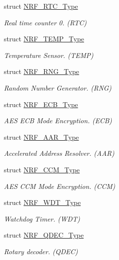 \begin{DoxyCompactItemize}
struct \hyperlink{struct_n_r_f___r_t_c___type}{N\+R\+F\+\_\+\+R\+T\+C\+\_\+\+Type}
\begin{DoxyCompactList}\small\item\em Real time counter 0. (R\+T\+C) \end{DoxyCompactList}\item 
struct \hyperlink{struct_n_r_f___t_e_m_p___type}{N\+R\+F\+\_\+\+T\+E\+M\+P\+\_\+\+Type}
\begin{DoxyCompactList}\small\item\em Temperature Sensor. (T\+E\+M\+P) \end{DoxyCompactList}\item 
struct \hyperlink{struct_n_r_f___r_n_g___type}{N\+R\+F\+\_\+\+R\+N\+G\+\_\+\+Type}
\begin{DoxyCompactList}\small\item\em Random Number Generator. (R\+N\+G) \end{DoxyCompactList}\item 
struct \hyperlink{struct_n_r_f___e_c_b___type}{N\+R\+F\+\_\+\+E\+C\+B\+\_\+\+Type}
\begin{DoxyCompactList}\small\item\em A\+E\+S E\+C\+B Mode Encryption. (E\+C\+B) \end{DoxyCompactList}\item 
struct \hyperlink{struct_n_r_f___a_a_r___type}{N\+R\+F\+\_\+\+A\+A\+R\+\_\+\+Type}
\begin{DoxyCompactList}\small\item\em Accelerated Address Resolver. (A\+A\+R) \end{DoxyCompactList}\item 
struct \hyperlink{struct_n_r_f___c_c_m___type}{N\+R\+F\+\_\+\+C\+C\+M\+\_\+\+Type}
\begin{DoxyCompactList}\small\item\em A\+E\+S C\+C\+M Mode Encryption. (C\+C\+M) \end{DoxyCompactList}\item 
struct \hyperlink{struct_n_r_f___w_d_t___type}{N\+R\+F\+\_\+\+W\+D\+T\+\_\+\+Type}
\begin{DoxyCompactList}\small\item\em Watchdog Timer. (W\+D\+T) \end{DoxyCompactList}\item 
struct \hyperlink{struct_n_r_f___q_d_e_c___type}{N\+R\+F\+\_\+\+Q\+D\+E\+C\+\_\+\+Type}
\begin{DoxyCompactList}\small\item\em Rotary decoder. (Q\+D\+E\+C) \end{DoxyCompactList}\item 

\end{DoxyCompactItemize}
